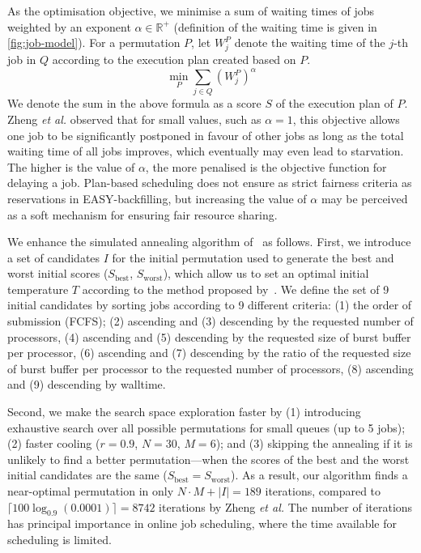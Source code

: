 \documentclass[runningheads]{llncs}
\newcommand\fixme[1]{
	\textcolor{blue}{{{\em\bf{[{\sc{{Fixme:}}} #1]}}}}
	}
\begin{document}
As the optimisation objective, we minimise a sum of waiting times of jobs weighted by an exponent $\alpha \in \mathbb{R}^+$ (definition of the waiting time is given in \cref{fig:job-model}). For a permutation $P$, let $W_j^P$ denote the waiting time of the $j$-th job in $Q$ according to the execution plan created based on $P$.
\begin{equation}
    \min_P \sum_{j \in Q} (W_j^P)^\alpha
    \label{eq:objective}
\end{equation}
We denote the sum in the above formula as a score $S$ of the execution plan of $P$. Zheng \textit{et al.} observed that for small values, such as $\alpha=1$, this objective allows one job to be significantly postponed in favour of other jobs as long as the total waiting time of all jobs improves, which eventually may even lead to starvation. The higher is the value of $\alpha$, the more penalised is the objective function for delaying a job. Plan-based scheduling does not ensure as strict fairness criteria as reservations in EASY-backfilling, but increasing the value of $\alpha$ may be perceived as a soft mechanism for ensuring fair resource sharing. 

We enhance the simulated annealing algorithm of~\cite{7776518} as follows.
First, we introduce a set of candidates $I$ for the initial permutation used to generate the best and worst initial scores ($S_{\text{best}}$, $S_{\text{worst}}$), which allow us to set an optimal initial temperature $T$ according to the method proposed by~\cite{10.1023/B:COAP.0000044187.23143.bd}. We define the set of 9 initial candidates by sorting jobs according to 9 different criteria: (1) the order of submission (FCFS); (2) ascending and (3) descending by the requested number of processors, (4) ascending and (5) descending by the requested size of burst buffer per processor, (6) ascending and (7) descending by the ratio of the requested size of burst buffer per processor to the requested number of processors, (8) ascending and (9) descending by walltime. 

Second, we make the search space exploration faster by (1) introducing exhaustive search over all possible permutations for small queues (up to 5 jobs); (2) faster cooling ($r=0.9$, $N=30$, $M=6$); and (3) skipping the annealing if it is unlikely to find a better permutation---when the scores of the best and the worst initial candidates are the same ($S_{\text{best}} = S_{\text{worst}}$). As a result, our algorithm finds a near-optimal permutation in only $N \cdot M + |I| = 189$ iterations, compared to $\lceil 100 \log_{0.9}(0.0001) \rceil = 8742$ iterations by Zheng \textit{et al.} The number of iterations has principal importance in online job scheduling, where the time available for scheduling is limited.
\end{document}
